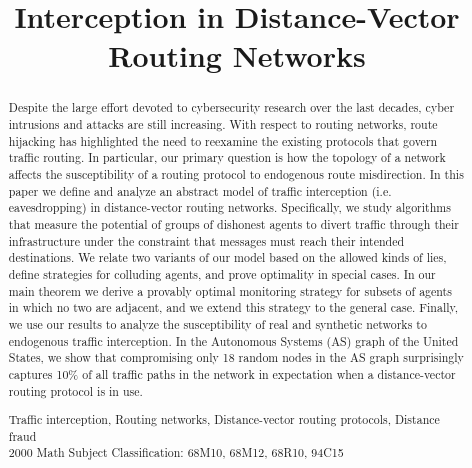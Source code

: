 \documentclass{comnet}
\begin{document}
\title{Interception in Distance-Vector Routing Networks}


\author{
		\address{University of Pittsburgh}
		\address{Rice University}
		\address{University of Illinois at Chicago}
		\address{University of Chicago}
}

\maketitle

\begin{abstract}
{Despite the large effort devoted to cybersecurity research over the last
decades, cyber intrusions and attacks are still increasing. With respect to
routing networks, route hijacking has highlighted the need to reexamine the
existing protocols that govern traffic routing. In particular, our primary
question is how the topology of a network affects the susceptibility of a
routing protocol to endogenous route misdirection. In this paper we define and
analyze an abstract model of traffic interception (i.e. eavesdropping) in
distance-vector routing networks. Specifically, we study algorithms that
measure the potential of groups of dishonest agents to divert traffic through
their infrastructure under the constraint that messages must reach their
intended destinations. We relate two variants of our model based on the allowed
kinds of lies, define strategies for colluding agents, and prove optimality in
special cases. In our main theorem we derive a provably optimal monitoring
strategy for subsets of agents in which no two are adjacent, and we extend this
strategy to the general case. Finally, we use our results to analyze the
susceptibility of real and synthetic networks to endogenous traffic
interception. In the Autonomous Systems (AS) graph of the United States, we
show that compromising only 18 random nodes in the AS graph surprisingly
captures 10\% of all traffic paths in the network in expectation when a
distance-vector routing protocol is in use.}

{Traffic interception, Routing networks, Distance-vector routing protocols, Distance fraud}
\\
2000 Math Subject Classification: 68M10, 68M12, 68R10, 94C15 
\end{abstract}
\end{document}

